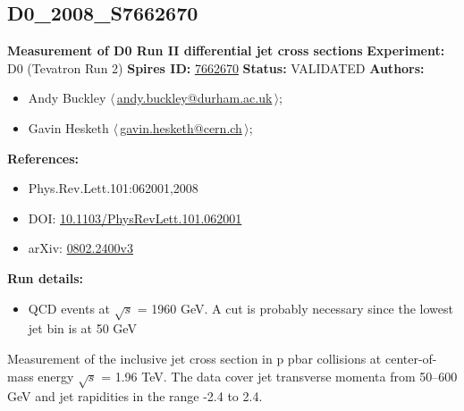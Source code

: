 \subsection[D0\_2008\_S7662670]{D0\_2008\_S7662670\,\cite{:2008hua}}
\textbf{Measurement of D0 Run II differential jet cross sections}\newline
\textbf{Experiment:} D0 (Tevatron Run 2) \newline
\textbf{Spires ID:} \href{http://www.slac.stanford.edu/spires/find/hep/www?rawcmd=key+7662670}{7662670}\newline
\textbf{Status:} VALIDATED\newline
\textbf{Authors:}
\begin{itemize}
  \item Andy Buckley $\langle\,$\href{mailto:andy.buckley@durham.ac.uk}{andy.buckley@durham.ac.uk}$\,\rangle$;
  \item Gavin Hesketh $\langle\,$\href{mailto:gavin.hesketh@cern.ch}{gavin.hesketh@cern.ch}$\,\rangle$;
\end{itemize}
\textbf{References:}
\begin{itemize}
  \item Phys.Rev.Lett.101:062001,2008
  \item DOI: \href{http://dx.doi.org/10.1103/PhysRevLett.101.062001}{10.1103/PhysRevLett.101.062001}
  \item arXiv: \href{http://arxiv.org/abs/0802.2400v3}{0802.2400v3}
\end{itemize}
\textbf{Run details:}
\begin{itemize}

  \item QCD events at \ensuremath{\sqrt{s}} = 1960 GeV. A \pTmin cut is probably necessary since  the lowest jet \pT bin is at 50 GeV\end{itemize}

\noindent Measurement of the inclusive jet cross section in p pbar collisions at center-of-mass energy \ensuremath{\sqrt{s}} = 1.96 TeV. The data cover jet transverse momenta from 50--600 GeV and jet rapidities in the range -2.4 to 2.4.

\clearpage


\clearpage


